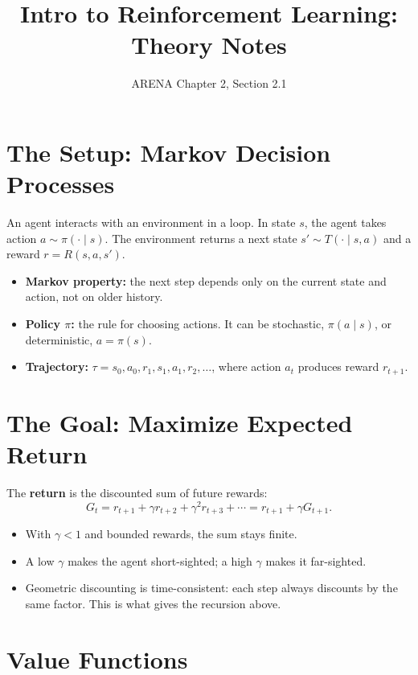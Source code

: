 \documentclass[11pt]{article}
\title{Intro to Reinforcement Learning: Theory Notes}
\author{ARENA Chapter 2, Section 2.1}
\date{}
\begin{document}
\maketitle
\tableofcontents

\section{The Setup: Markov Decision Processes}

An agent interacts with an environment in a loop. In state $s$, the agent takes
action $a \sim \pi(\cdot \mid s)$. The environment returns a next state
$s' \sim T(\cdot \mid s, a)$ and a reward $r = R(s, a, s')$.

\begin{itemize}
  \item \textbf{Markov property:} the next step depends only on the current state
        and action, not on older history.
  \item \textbf{Policy $\pi$:} the rule for choosing actions. It can be stochastic,
        $\pi(a \mid s)$, or deterministic, $a = \pi(s)$.
  \item \textbf{Trajectory:} $\tau = s_0, a_0, r_1, s_1, a_1, r_2, \ldots$, where
        action $a_t$ produces reward $r_{t+1}$.
\end{itemize}

\section{The Goal: Maximize Expected Return}

The \textbf{return} is the discounted sum of future rewards:
\[
  G_t = r_{t+1} + \gamma r_{t+2} + \gamma^2 r_{t+3} + \cdots = r_{t+1} + \gamma G_{t+1}.
\]

\begin{itemize}
  \item With $\gamma < 1$ and bounded rewards, the sum stays finite.
  \item A low $\gamma$ makes the agent short-sighted; a high $\gamma$ makes it far-sighted.
  \item Geometric discounting is time-consistent: each step always discounts by the
        same factor. This is what gives the recursion above.
\end{itemize}

\section{Value Functions}
\end{document}
